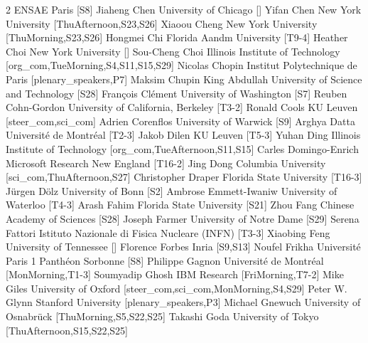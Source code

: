 \documentclass[12pt,lettersize,oneside]{book} %
\begin{document}
\begin{multicols}{2}
  {ENSAE Paris}
  [S8]
\participantne
  {Jiaheng Chen}
  {University of Chicago}
  []
\participantne
  {Yifan Chen}
  {New York University}
  [ThuAfternoon,S23,S26]
\participantne
  {Xiaoou Cheng}
  {New York University}
  [ThuMorning,S23,S26]
\participantne
  {Hongmei Chi}
  {Florida Aandm University}
  [T9-4]
\participantne
  {Heather Choi}
  {New York University}
  []
\participantne
  {Sou-Cheng Choi}
  {Illinois Institute of Technology}
  [org_com,TueMorning,S4,S11,S15,S29]
\participantne
  {Nicolas Chopin}
  {Institut Polytechnique de Paris}
  [plenary_speakers,P7]
\participantne
  {Maksim Chupin}
  {King Abdullah University of Science and Technology}
  [S28]
\participantne
  {Fran\c{c}ois Cl\'ement}
  {University of Washington}
  [S7]
\participantne
  {Reuben Cohn-Gordon}
  {University of California, Berkeley}
  [T3-2]
\participantne
  {Ronald Cools}
  {KU Leuven}
  [steer_com,sci_com]
\participantne
  {Adrien Corenflos}
  {University of Warwick}
  [S9]
\participantne
  {Arghya Datta}
  {Universit\'e de Montr\'eal}
  [T2-3]
\participantne
  {Jakob Dilen}
  {KU Leuven}
  [T5-3]
\participantne
  {Yuhan Ding}
  {Illinois Institute of Technology}
  [org_com,TueAfternoon,S11,S15]
\participantne
  {Carles Domingo-Enrich}
  {Microsoft Research New England}
  [T16-2]
\participantne
  {Jing Dong}
  {Columbia University}
  [sci_com,ThuAfternoon,S27]
\participantne
  {Christopher Draper}
  {Florida State University}
  [T16-3]
\participantne
  {J\"urgen D\"olz}
  {University of Bonn}
  [S2]
\participantne
  {Ambrose Emmett-Iwaniw}
  {University of Waterloo}
  [T4-3]
\participantne
  {Arash Fahim}
  {Florida State University}
  [S21]
\participantne
  {Zhou Fang}
  {Chinese Academy of Sciences}
  [S28]
\participantne
  {Joseph Farmer}
  {University of Notre Dame}
  [S29]
\participantne
  {Serena Fattori}
  {Istituto Nazionale di Fisica Nucleare (INFN)}
  [T3-3]
\participantne
  {Xiaobing Feng}
  {University of Tennessee}
  []
\participantne
  {Florence Forbes}
  {Inria}
  [S9,S13]
\participantne
  {Noufel Frikha}
  {Universit\'e Paris 1 Panth\'eon Sorbonne}
  [S8]
\participantne
  {Philippe Gagnon}
  {Universit\'e de Montr\'eal}
  [MonMorning,T1-3]
\participantne
  {Soumyadip Ghosh}
  {IBM Research}
  [FriMorning,T7-2]
\participantne
  {Mike Giles}
  {University of Oxford}
  [steer_com,sci_com,MonMorning,S4,S29]
\participantne
  {Peter W. Glynn}
  {Stanford University}
  [plenary_speakers,P3]
\participantne
  {Michael Gnewuch}
  {University of Osnabr\"uck}
  [ThuMorning,S5,S22,S25]
\participantne
  {Takashi Goda}
  {University of Tokyo}
  [ThuAfternoon,S15,S22,S25]

\end{multicols}
\end{document}
